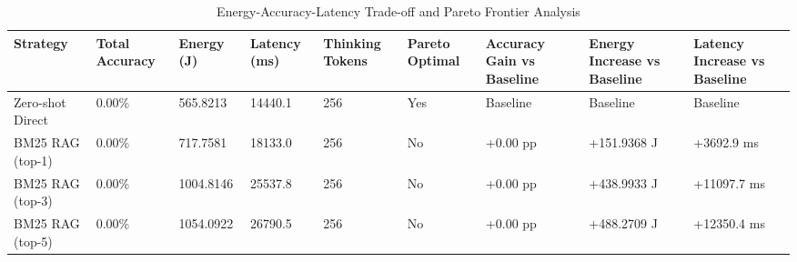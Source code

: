 \begin{table}
\caption{Energy-Accuracy-Latency Trade-off and Pareto Frontier Analysis}
\label{tab:tradeoff_comparison}
\begin{tabular}{lllllllll}
\toprule
Strategy & Total Accuracy & Energy (J) & Latency (ms) & Thinking Tokens & Pareto Optimal & Accuracy Gain vs Baseline & Energy Increase vs Baseline & Latency Increase vs Baseline \\
\midrule
Zero-shot Direct & 0.00\% & 565.8213 & 14440.1 & 256 & Yes & Baseline & Baseline & Baseline \\
BM25 RAG (top-1) & 0.00\% & 717.7581 & 18133.0 & 256 & No & +0.00 pp & +151.9368 J & +3692.9 ms \\
BM25 RAG (top-3) & 0.00\% & 1004.8146 & 25537.8 & 256 & No & +0.00 pp & +438.9933 J & +11097.7 ms \\
BM25 RAG (top-5) & 0.00\% & 1054.0922 & 26790.5 & 256 & No & +0.00 pp & +488.2709 J & +12350.4 ms \\
\bottomrule
\end{tabular}
\end{table}
